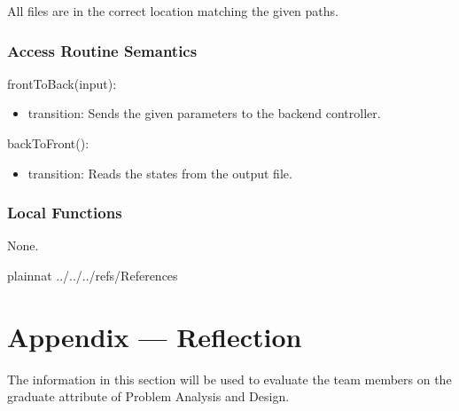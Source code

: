 \documentclass[12pt, titlepage]{article}
\begin{document}
All files are in the correct location matching the given paths.

\subsubsection{Access Routine Semantics}

\noindent frontToBack(input):
\begin{itemize}
\item transition: Sends the given parameters to the backend controller.
\end{itemize}

\noindent backToFront():
\begin{itemize}
  \item transition: Reads the states from the output file.
\end{itemize}

\subsubsection{Local Functions}

None.

\newpage

 {plainnat}
 {../../../refs/References}


\newpage{}

\section*{Appendix --- Reflection}



The information in this section will be used to evaluate the team members on the
graduate attribute of Problem Analysis and Design.


\end{document}
